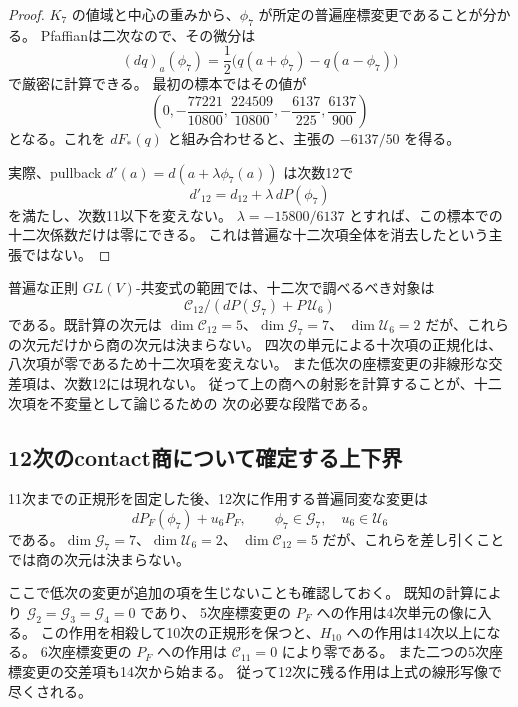 \begin{proof}
$K_7$ の値域と中心の重みから、$\phi_7$ が所定の普遍座標変更であることが分かる。
Pfaffianは二次なので、その微分は
\[
 (dq)_a(\phi_7)=\frac12\bigl(q(a+\phi_7)-q(a-\phi_7)\bigr)
\]
で厳密に計算できる。
最初の標本ではその値が
\[
 \left(0,-\frac{77221}{10800},
 \frac{224509}{10800},-\frac{6137}{225},\frac{6137}{900}\right)
\]
となる。これを $dF_*(q)$ と組み合わせると、主張の $-6137/50$ を得る。

実際、pullback $d'(a)=d(a+\lambda\phi_7(a))$ は次数12で
\[
                       d'_{12}=d_{12}+\lambda\,dP(\phi_7)
\]
を満たし、次数11以下を変えない。
$\lambda=-15800/6137$ とすれば、この標本での十二次係数だけは零にできる。
これは普遍な十二次項全体を消去したという主張ではない。
\end{proof}

普遍な正則 $GL(V)$-共変式の範囲では、十二次で調べるべき対象は
\[
 \mathcal C_{12}\Big/
 \left(dP(\mathcal G_7)+P\,\mathcal U_6\right)
\]
である。既計算の次元は
$\dim\mathcal C_{12}=5$、$\dim\mathcal G_7=7$、
$\dim\mathcal U_6=2$ だが、これらの次元だけから商の次元は決まらない。
四次の単元による十次項の正規化は、八次項が零であるため十二次項を変えない。
また低次の座標変更の非線形な交差項は、次数12には現れない。
従って上の商への射影を計算することが、十二次項を不変量として論じるための
次の必要な段階である。


\subsection{12次のcontact商について確定する上下界}
\label{subsec:degree-twelve-contact-bounds}

11次までの正規形を固定した後、12次に作用する普遍同変な変更は
\[
 dP_F(\phi_7)+u_6P_F,
 \qquad \phi_7\in\mathcal G_7,\quad u_6\in\mathcal U_6
\]
である。$\dim\mathcal G_7=7$、$\dim\mathcal U_6=2$、
$\dim\mathcal C_{12}=5$ だが、これらを差し引くことでは商の次元は決まらない。

ここで低次の変更が追加の項を生じないことも確認しておく。
既知の計算により $\mathcal G_2=\mathcal G_3=\mathcal G_4=0$ であり、
5次座標変更の $P_F$ への作用は4次単元の像に入る。
この作用を相殺して10次の正規形を保つと、$H_{10}$ への作用は14次以上になる。
6次座標変更の $P_F$ への作用は $\mathcal C_{11}=0$ により零である。
また二つの5次座標変更の交差項も14次から始まる。
従って12次に残る作用は上式の線形写像で尽くされる。

